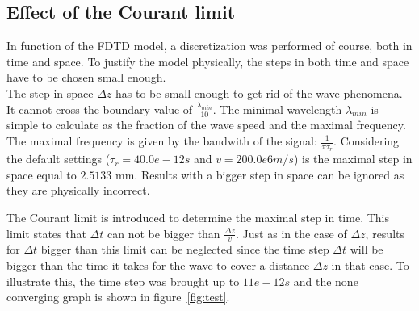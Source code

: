 \subsection{Effect of the Courant limit}

In function of the FDTD model, a discretization was performed of course, both in time and space. To justify the model physically, the steps in both time and space have to be chosen small enough. \\
The step in space $\Delta z$ has to be small enough to get rid of the wave phenomena. It cannot cross the boundary value of $\frac{\lambda_{min}}{10}$. The minimal wavelength $\lambda_{min}$ is simple to calculate as the fraction of the wave speed and the maximal frequency. The maximal frequency is given by the bandwith of the signal: $\frac{1}{\pi \tau_r}$. Considering the default settings ($\tau_r = 40.0e-12 s$ and $v = 200.0e6 m/s$) is the maximal step in space equal to $2.5133$ mm. Results with a bigger step in space can be ignored as they are physically incorrect.



The Courant limit is introduced to determine the maximal step in time. This limit states that $\Delta t$ can not be bigger than $\frac{\Delta z}{v}$. Just as in the case of $\Delta z$, results for $\Delta t$ bigger than this limit can be neglected since the time step $\Delta t$ will be bigger than the time it takes for the wave to cover a distance $\Delta z$ in that case. To illustrate this, the time step was brought up to $11e-12 s$ and the none converging graph is shown in figure~\ref{fig:test}.

